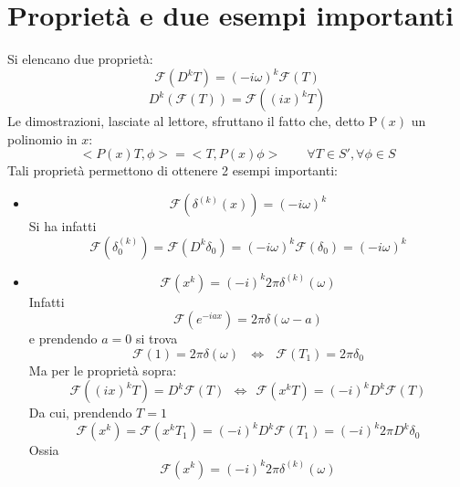 \documentclass[twoside]{article}
\begin{document}
\newpage
\section{Proprietà e due esempi importanti}
Si elencano due proprietà:
    \begin{equation}
        \mathcal{F}(D^kT)=(-i\omega)^k \mathcal{F}(T)
        \end{equation}
        \begin{equation}\label{18.0.2}
          D^k(\mathcal{F}(T))=\mathcal{F}((ix)^kT)
        \end{equation}
Le dimostrazioni, lasciate al lettore, sfruttano il fatto che, detto P$(x)$ un polinomio in $x$:
\begin{equation}
    <P(x)T,\phi>=<T,P(x)\phi> \qquad \forall T\in S', \forall \phi\in S
\end{equation}
Tali proprietà permettono di ottenere 2 esempi importanti:
\begin{itemize}
    \item 
    \begin{equation}
        \mathcal{F}(\delta^{(k)}(x))=(-i\omega)^k
    \end{equation}
    Si ha infatti 
    \begin{equation}
        \mathcal{F}(\delta_0 ^{(k)})=\mathcal{F}(D^k \delta_0)=(-i\omega)^k \mathcal{F}(\delta_0)=(-i\omega)^k
    \end{equation}
    \item
    \begin{equation}
        \mathcal{F}(x^k)=(-i)^k2\pi \delta^{(k)}(\omega)
    \end{equation}
    Infatti
    \begin{equation}
        \mathcal{F}(e^{-iax})=2\pi \delta(\omega -a)
    \end{equation}
     e prendendo $a=0$ si trova
     \begin{equation}
         \mathcal{F}(1)=2\pi \delta(\omega) \ \ \ \iff \ \ \ \mathcal{F}(T_1)=2\pi \delta_0
     \end{equation}
     Ma per le proprietà sopra:
     \begin{equation}
         \mathcal{F}((ix)^kT)=D^k \mathcal{F}(T) \ \ \iff \ \ \mathcal{F}(x^kT)=(-i)^kD^k\mathcal{F}(T)
     \end{equation}
     Da cui, prendendo $T=1$
     \begin{equation}
         \mathcal{F}(x^k)=\mathcal{F}(x^kT_1)=(-i)^kD^k\mathcal{F}(T_1)=(-i)^k2\pi D^k \delta_0
     \end{equation}
     Ossia
     \begin{equation}
         \mathcal{F}(x^k)=(-i)^k2\pi \delta^{(k)}(\omega)
     \end{equation}
\end{itemize}
\end{document}
